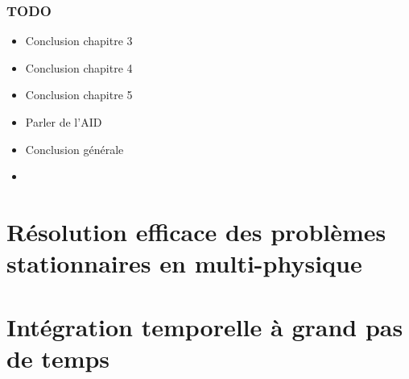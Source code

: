 



\makeflyleaf
{}

\tableofcontents
{}



\section*{TODO}
\begin{itemize}
  \item Conclusion chapitre 3
  \item Conclusion chapitre 4
  \item Conclusion chapitre 5
  \item Parler de l'AID
  \item Conclusion générale
  \item {}
\end{itemize}


\part{Résolution efficace des problèmes stationnaires en multi-physique}

  

  

  

\part{Intégration temporelle à grand pas de temps}

    

    







